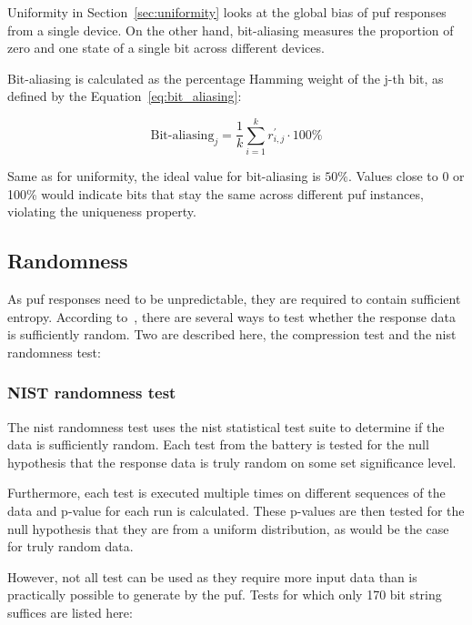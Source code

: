 Uniformity in Section~\ref{sec:uniformity} looks at the global bias of \gls{puf} responses from a single device. On the other hand, bit-aliasing measures the proportion of zero and one state of a single bit across different devices.

Bit-aliasing is calculated as the percentage Hamming weight of the j-th bit, as defined by the Equation~\ref{eq:bit_aliasing}:

\begin{equation}\label{eq:bit_aliasing}
    \textrm{Bit-aliasing}_{j} = \frac{1}{k}\sum_{i=1}^{k}r_{i, j}^{'} \cdot 100\%
\end{equation}

Same as for uniformity, the ideal value for bit-aliasing is $50\%$. Values close to 0 or 100\% would indicate bits that stay the same across different \gls{puf} instances, violating the uniqueness property.

\subsection{Randomness}

As \gls{puf} responses need to be unpredictable, they are required to contain sufficient entropy. According to~\cite{Leest2010}, there are several ways to test whether the response data is sufficiently random. Two are described here, the compression test and the \acrshort{nist} randomness test:

\subsubsection*{NIST randomness test}

The \acrshort{nist} randomness test uses the \acrshort{nist} statistical test suite to determine if the data is sufficiently random. Each test from the battery is tested for the null hypothesis that the response data is truly random on some set significance level.

Furthermore, each test is executed multiple times on different sequences of the data and p-value for each run is calculated. These p-values are then tested for the null hypothesis that they are from a uniform distribution, as would be the case for truly random data.\cite{NIST2010}

However, not all test can be used as they require more input data than is practically possible to generate by the \gls{puf}. Tests for which only 170 bit string suffices are listed here\cite{Leest2010}:

